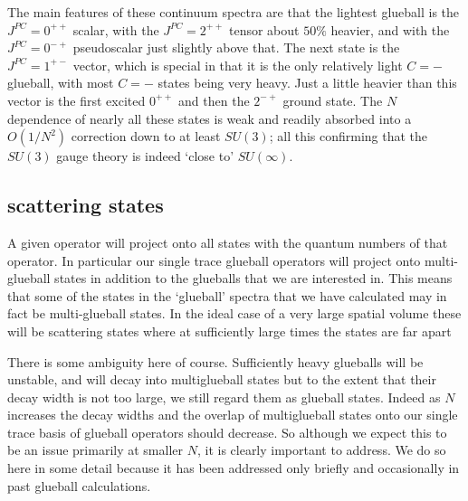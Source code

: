 \documentclass[12pt]{article}
\begin{document}
The main features of these continuum spectra are that the lightest glueball
is the $J^{PC}=0^{++}$ scalar, with the $J^{PC}=2^{++}$ tensor about $50\%$ heavier,
and with the  $J^{PC}=0^{-+}$ pseudoscalar just slightly above that. The next
state is the $J^{PC}=1^{+-}$ vector, which is special in that it is the only
relatively light $C=-$ glueball, with most $C=-$ states being very heavy.
Just a little heavier than this vector is the first excited $0^{++}$ and then the
$2^{-+}$ ground state. The $N$ dependence of nearly all these states is weak and readily
absorbed into a $O(1/N^2)$ correction down to at least $SU(3)$; all this confirming
that the $SU(3)$ gauge theory is indeed `close to' $SU(\infty)$.


%
%
\subsection{scattering states}
\label{subsection_scattstates}

A given operator will project onto all states with the quantum numbers of that operator.
In particular our single trace glueball operators will project onto multi-glueball states
in addition to the glueballs that we are interested in. This means that some of the states
in the `glueball' spectra that we have calculated may in fact be multi-glueball
states. In the ideal case of a very large spatial volume these will be scattering states
where at sufficiently large times the states are far apart 


There is some ambiguity here of course. Sufficiently heavy glueballs
will be unstable, and will decay into multiglueball states but to the extent
that their decay width is not too large, we still regard them as glueball states.
Indeed as $N$ increases the decay widths and the overlap of multiglueball
states onto our single trace basis of glueball operators
should decrease. So although we expect
this to be an issue primarily at smaller $N$, it is clearly important to address.
We do so here in some detail because it has been addressed only briefly and
occasionally in past glueball calculations.
\end{document}
